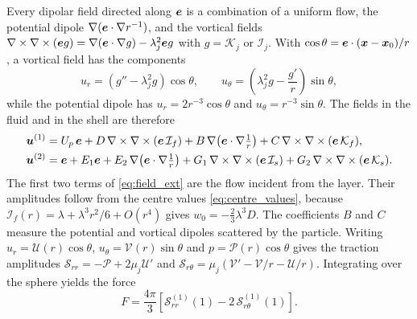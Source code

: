 Every dipolar field directed along $\bm{e}$ is a combination of a uniform flow, the potential dipole
$\nabla(\bm{e}\cdot\nabla r^{-1})$, and the vortical fields $\nabla\times\nabla\times(\bm{e} g)=\nabla(\bm{e}\cdot\nabla g)-\lambda_j^2\bm{e} g$
with $g=\mathcal K_j$ or $\mathcal I_j$. With $\cos\theta=\bm{e}\cdot(\bm{x}-\bm{x}_0)/r$, a vortical field has the components
\begin{equation}
  u_r=\left(g''-\lambda_j^2g\right)\cos\theta,\qquad u_\theta=\left(\lambda_j^2g-\frac{g'}{r}\right)\sin\theta,
  \label{eq:vort_radial}
\end{equation}
while the potential dipole has $u_r=2r^{-3}\cos\theta$ and $u_\theta=r^{-3}\sin\theta$. The fields in the fluid and in
the shell are therefore
\begin{subequations}\label{eq:fields}
\begin{align}
  \bm{u}^{(1)}&=U_p\,\bm{e}+D\,\nabla\times\nabla\times(\bm{e}\,\mathcal I_f)
  +B\,\nabla\!\left(\bm{e}\cdot\nabla\tfrac1r\right)+C\,\nabla\times\nabla\times(\bm{e}\,\mathcal K_f),
  \label{eq:field_ext}\\
  \bm{u}^{(2)}&=\bm{e}+E_1\bm{e}+E_2\,\nabla\!\left(\bm{e}\cdot\nabla\tfrac1r\right)
  +G_1\,\nabla\times\nabla\times(\bm{e}\,\mathcal I_s)+G_2\,\nabla\times\nabla\times(\bm{e}\,\mathcal K_s).
  \label{eq:field_shell}
\end{align}
\end{subequations}
The first two terms of \cref{eq:field_ext} are the flow incident from the layer. Their amplitudes follow from the centre
values \eqref{eq:centre_values}, because $\mathcal I_f(r)=\lambda+\lambda^3r^2/6+O(r^4)$ gives $w_0=-\tfrac23\lambda^3D$.
The coefficients $B$ and $C$ measure the potential and vortical dipoles scattered by the particle. Writing
$u_r=\mathcal U(r)\cos\theta$, $u_\theta=\mathcal V(r)\sin\theta$ and $p=\mathcal P(r)\cos\theta$ gives the traction
amplitudes $\mathcal S_{rr}=-\mathcal P+2\mu_j\mathcal U'$ and $\mathcal S_{r\theta}=\mu_j(\mathcal V'-\mathcal
V/r-\mathcal U/r)$. Integrating over the sphere yields the force
\begin{equation}
  F=\frac{4\pi}{3}\left[\mathcal S^{(1)}_{rr}(1)-2\,\mathcal S^{(1)}_{r\theta}(1)\right].
  \label{eq:force_amplitudes}
\end{equation}

